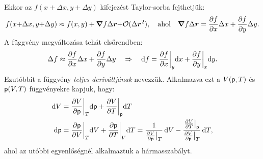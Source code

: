 \FloatBarrier
Ekkor az $f(x{+}\Delta x{,}y{+}\Delta y)$ kifejezést Taylor-sorba fejthetjük:
\begin{align}
    f(x{+}\Delta x,y{+}\Delta y)\approx f(x,y) + \bm\nabla f \Delta \bm r{+}\mathcal O(\Delta \bm r^2),\quad \textnormal{ahol}\quad \bm\nabla f \Delta \bm r = \frac{\partial{f}}{\partial{x}}\Delta x+\frac{\partial{f}}{\partial{y}} \Delta y.
\end{align}
A függvény megváltozása tehát elsőrendben:
\begin{align}
    \Delta f\approx \frac{\partial{f}}{\partial{x}}\Delta x+\frac{\partial{f}}{\partial{y}} \Delta y \quad\Rightarrow\quad \mathrm{d}f = \frac{\partial{f}}{\partial{x}}\bigg|_y\mathrm{d} x+\frac{\partial{f}}{\partial{y}}\bigg|_x \mathrm{d} y.
\end{align}
Ezutóbbit a függvény \emph{teljes deriváltjának} nevezzük. Alkalmazva ezt a $V(\mathsf p,T)$ és $\mathsf p(V,T)$ függvényekre kapjuk, hogy:
\begin{align}
    \mathrm{d} V &= \frac{\partial{V}}{\partial{\mathsf p}}\bigg|_T \mathrm{d}\mathsf p + \frac{\partial{V}}{\partial{T}}\bigg|_\mathsf p \mathrm{d}T \\
    \mathrm{d} \mathsf p &= \frac{\partial{\mathsf p}}{\partial{V}}\bigg|_T\mathrm{d}V + \frac{\partial{\mathsf p}}{\partial{T}}\bigg|_V \mathrm{d}T = \frac{1}{\frac{\partial{V}}{\partial{\mathsf p}}\big|_T}\,\mathrm{d} V - \frac{\frac{\partial{V}}{\partial{T}}\big|_\mathsf p}{\frac{\partial{V}}{\partial{\mathsf p}}\big|_T}\,\mathrm{d} T,
\end{align}
ahol az utóbbi egyenlőségnél alkalmaztuk a hármasszabályt.
